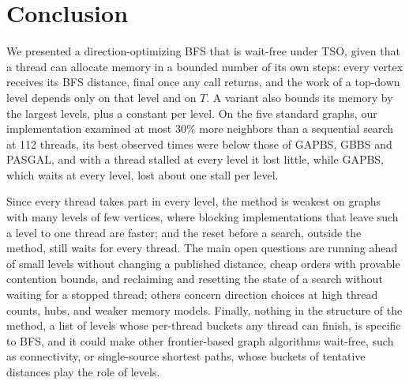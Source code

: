 \section{Conclusion}
\label{sec:conclusion}

We presented a direction-optimizing BFS that is wait-free under TSO, given that a thread can allocate memory in a bounded number of its own steps: every vertex receives its BFS distance, final once any call returns, and the work of a top-down level depends only on that level and on $T$. A variant also bounds its memory by the largest levels, plus a constant per level. On the five standard graphs, our implementation examined at most 30\% more neighbors than a sequential search at 112 threads, its best observed times were below those of GAPBS, GBBS and PASGAL, and with a thread stalled at every level it lost little, while GAPBS, which waits at every level, lost about one stall per level.

Since every thread takes part in every level, the method is weakest on graphs with many levels of few vertices, where blocking implementations that leave such a level to one thread are faster; and the reset before a search, outside the method, still waits for every thread. The main open questions are running ahead of small levels without changing a published distance, cheap orders with provable contention bounds, and reclaiming and resetting the state of a search without waiting for a stopped thread; others concern direction choices at high thread counts, hubs, and weaker memory models. Finally, nothing in the structure of the method, a list of levels whose per-thread buckets any thread can finish, is specific to BFS, and it could make other frontier-based graph algorithms wait-free, such as connectivity, or single-source shortest paths, whose buckets of tentative distances play the role of levels.
